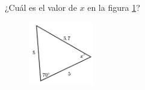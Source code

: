 \question[15]  ¿Cuál es el valor de $x$ en la figura \ref{fig:findangle10}?
\begin{figure}[H]
    \begin{center}
        \includegraphics[width=0.25\textwidth]{../images/findangle10.png}
    \end{center}
    \caption{}
    \label{fig:findangle10}
\end{figure}